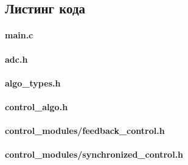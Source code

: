 \clearpage
\subsection{Листинг кода}

\paragraph{main.c}
\label{module_main}


\paragraph{adc.h}
\label{module_adc}



\paragraph{algo\_types.h}
\label{module_algo_types}



\paragraph{control\_algo.h}
\label{module_control_algo}



\paragraph{control\_modules/feedback\_control.h}
\label{module_control_modules_feedback_control}



\paragraph{control\_modules/synchronized\_control.h}
\label{module_control_modules_synchronized_control}



